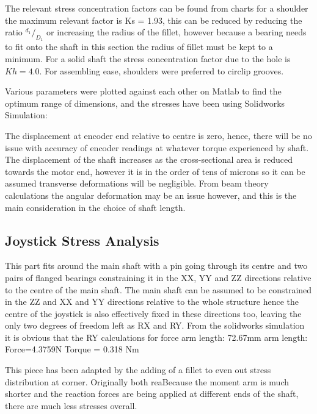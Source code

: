 The relevant stress concentration factors can be found from charts for a shoulder the maximum relevant factor is Ks = 1.93, this can be reduced by reducing the ratio $^{d_1}/_{D_1}$ or increasing the radius of the fillet, however because a bearing needs to fit onto the shaft in this section the radius of fillet must be kept to a minimum. For a solid shaft the stress concentration factor due to the hole is  $Kh = 4.0$. For assembling ease, shoulders were preferred to circlip grooves.

Various parameters were plotted against each other on Matlab to find the optimum range of dimensions, and the stresses have been using Solidworks Simulation:

The displacement at encoder end relative to centre is zero, hence, there will be no issue with accuracy of encoder readings at whatever torque experienced by shaft. The displacement of the shaft increases as the cross-sectional area is reduced towards the motor end, however it is in the order of tens of microns so it can be assumed transverse deformations will be negligible. From beam theory calculations the angular deformation may be an issue however, and this is the main consideration in the choice of shaft length.


\subsection{Joystick Stress Analysis} %
\label{sub:joystick_stress_analysis}

This part fits around the main shaft with a pin going through its centre and two pairs of flanged bearings constraining it in the XX, YY and ZZ directions relative to the centre of the main shaft. The main shaft can be assumed to be constrained in the ZZ and XX and YY directions relative to the whole structure hence the centre of the joystick is also effectively fixed in these directions too, leaving the only two degrees of freedom left as RX and RY.
From the solidworks simulation it is obvious that the
RY calculations for force arm length: 72.67mm arm length: Force=4.3759N Torque = 0.318 Nm

This piece has been adapted by the adding of a fillet to even out stress distribution at corner.
Originally both reaBecause the moment arm is much shorter and the reaction forces are being applied at different ends of the shaft, there are much less stresses overall.

